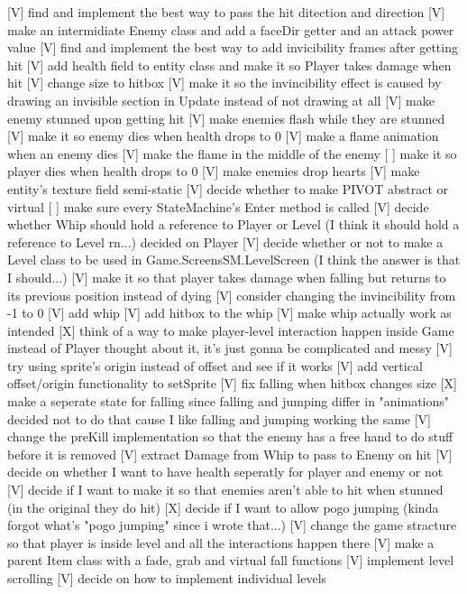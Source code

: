 [V] find and implement the best way to pass the hit ditection and direction
[V] make an intermidiate Enemy class and add a faceDir getter and an attack power value
[V] find and implement the best way to add invicibility frames after getting hit
[V] add health field to entity class and make it so Player takes damage when hit
[V] change size to hitbox
[V] make it so the invincibility effect is caused by drawing an invisible section in Update
	instead of not drawing at all
[V] make enemy stunned upon getting hit
[V] make enemies flash while they are stunned
[V] make it so enemy dies when health drops to 0
[V] make a flame animation when an enemy dies
[V] make the flame in the middle of the enemy
[ ] make it so player dies when health drops to 0
[V] make enemies drop hearts
[V] make entity's texture field semi-static
[V] decide whether to make PIVOT abstract or virtual
[ ] make sure every StateMachine's Enter method is called
[V] decide whether Whip should hold a reference to Player or Level
	(I think it should hold a reference to Level rn...)
	{decided on Player}
[V] decide whether or not to make a Level class to be used in Game.ScreensSM.LevelScreen
	(I think the answer is that I should...)
[V] make it so that player takes damage when falling but returns to its previous position
	instead of dying
[V] consider changing the invincibility from -1 to 0
[V] add whip
[V] add hitbox to the whip
[V] make whip actually work as intended
[X] think of a way to make player-level interaction happen inside Game instead of Player
	{thought about it, it's just gonna be complicated and messy}
[V] try using sprite's origin instead of offset and see if it works
[V] add vertical offset/origin functionality to setSprite
[V] fix falling when hitbox changes size
[X] make a seperate state for falling since falling and jumping differ in "animations"
	{decided not to do that cause I like falling and jumping working the same}
[V] change the preKill implementation so that the enemy has a free hand to do stuff before it is removed
[V] extract Damage from Whip to pass to Enemy on hit
[V] decide on whether I want to have health seperatly for player and enemy or not
[V] decide if I want to make it so that enemies aren't able to hit when stunned (in the original they do hit)
[X] decide if I want to allow pogo jumping (kinda forgot what's "pogo jumping" since i wrote that...)
[V] change the game stracture so that player is inside level and all the interactions happen there
[V] make a parent Item class with a fade, grab and virtual fall functions
[V] implement level scrolling
[V] decide on how to implement individual levels
